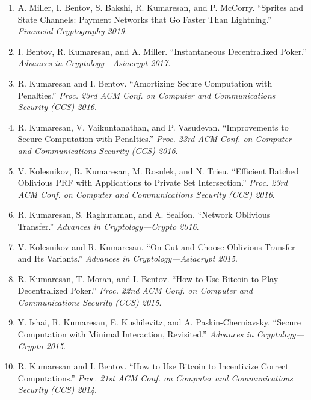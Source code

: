 \documentclass[11pt]{article}
\begin{document}
\begin{enumerate}[leftmargin=*, itemsep=1pt]
    \item A. Miller, I. Bentov, S. Bakshi, R. Kumaresan, and P. McCorry. ``Sprites and State Channels: Payment Networks that Go Faster Than Lightning.'' \textit{Financial Cryptography 2019.}
    
    \item I. Bentov, R. Kumaresan, and A. Miller. ``Instantaneous Decentralized Poker.'' \textit{Advances in Cryptology—Asiacrypt 2017.}
    
    \item R. Kumaresan and I. Bentov. ``Amortizing Secure Computation with Penalties.'' \textit{Proc. 23rd ACM Conf. on Computer and Communications Security (CCS) 2016}.
    
    \item R. Kumaresan, V. Vaikuntanathan, and P. Vasudevan. ``Improvements to Secure Computation with Penalties.'' \textit{Proc. 23rd ACM Conf. on Computer and Communications Security (CCS) 2016}.
    
    \item V. Kolesnikov, R. Kumaresan, M. Rosulek, and N. Trieu. ``Efficient Batched Oblivious PRF with Applications to Private Set Intersection.'' \textit{Proc. 23rd ACM Conf. on Computer and Communications Security (CCS) 2016}.
    
    \item R. Kumaresan, S. Raghuraman, and A. Sealfon. ``Network Oblivious Transfer.'' \textit{Advances in Cryptology—Crypto 2016}.
    
    \item V. Kolesnikov and R. Kumaresan. ``On Cut-and-Choose Oblivious Transfer and Its Variants.'' \textit{Advances in Cryptology—Asiacrypt 2015}.
    
    \item R. Kumaresan, T. Moran, and I. Bentov. ``How to Use Bitcoin to Play Decentralized Poker.'' \textit{Proc. 22nd ACM Conf. on Computer and Communications Security (CCS) 2015}.
    
    \item Y. Ishai, R. Kumaresan, E. Kushilevitz, and A. Paskin-Cherniavsky. ``Secure Computation with Minimal Interaction, Revisited.'' \textit{Advances in Cryptology—Crypto 2015}.
    
    \item R. Kumaresan and I. Bentov. ``How to Use Bitcoin to Incentivize Correct Computations.'' \textit{Proc. 21st ACM Conf. on Computer and Communications Security (CCS) 2014}.
    

\end{enumerate}
\end{document}
